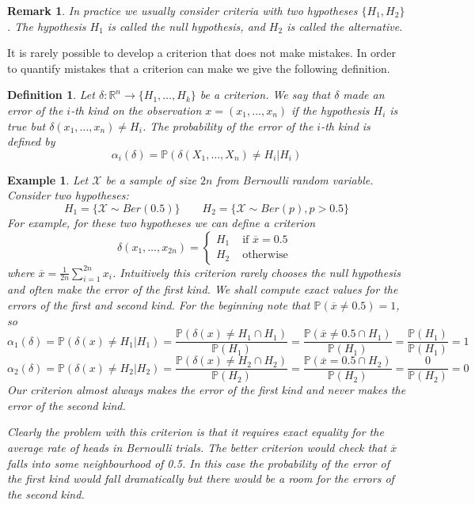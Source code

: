 \documentclass[12pt]{article}
\newtheorem{remark}[theorem]{Remark}
\newtheorem{definition}[theorem]{Definition}
\newtheorem{example}[theorem]{Example}
\begin{document}
\begin{remark} In practice we usually consider criteria with two hypotheses
    $\{H_1, H_2\}$. The hypothesis $H_1$ is called the null hypothesis, and
    $H_2$ is called the alternative.
\end{remark}

It is rarely possible to develop a criterion that does not make mistakes. In
order to quantify mistakes that a criterion can make we give the following
definition.

\begin{definition} Let $\delta:\mathbb{R}^n\to \{H_1,\ldots,H_k\}$ be a
    criterion. We say that $\delta$ made an error of the $i$-th kind on the
    observation $x=(x_1,\ldots,x_n)$ if the hypothesis $H_i$ is true but
    $\delta(x_1,\ldots,x_n)\neq H_i$. The probability of the error of the $i$-th
    kind is defined by
    $$
        \alpha_i(\delta)=\mathbb{P}(\delta(X_1,\ldots,X_n)\neq H_i | H_i)
    $$
\end{definition}

\begin{example} Let $\mathscr{X}$ be a sample of size $2n$ from Bernoulli random
    variable. Consider two hypotheses:
    $$
        H_1=\{\mathscr{X}\sim Ber(0.5)\}
        \quad\quad
        H_2=\{\mathscr{X}\sim Ber(p), p>0.5\}
    $$
    For example, for these two hypotheses we can define a criterion
    $$
        \delta(x_1,\ldots,x_{2n})
        =\begin{cases}
            H_1 & \mbox{ if } \overline{x}=0.5 \\
            H_2 & \mbox{ otherwise }
        \end{cases}
    $$
    where $\overline{x}=\frac{1}{2n}\sum_{i=1}^{2n} x_i$. Intuitively this
    criterion rarely chooses the null hypothesis and often make the error of
    the first kind. We shall compute exact values for the errors of the first
    and second kind. For the beginning note that $\mathbb{P}(\overline{x}\neq
        0.5)=1$, so
    $$
        \alpha_1(\delta)
        =\mathbb{P}(\delta(x)\neq H_1|H_1)
        =\frac{\mathbb{P}(\delta(x)\neq H_1 \cap H_1)}{\mathbb{P}(H_1)}
        =\frac{\mathbb{P}(\overline{x}\neq 0.5 \cap H_1)}{\mathbb{P}(H_1)}
        =\frac{\mathbb{P}(H_1)}{\mathbb{P}(H_1)}
        =1
    $$
    $$
        \alpha_2(\delta)
        =\mathbb{P}(\delta(x)\neq H_2|H_2)
        =\frac{\mathbb{P}(\delta(x)\neq H_2 \cap H_2)}{\mathbb{P}(H_2)}
        =\frac{\mathbb{P}(\overline{x}= 0.5 \cap H_2)}{\mathbb{P}(H_2)}
        =\frac{0}{\mathbb{P}(H_2)}
        =0
    $$
    Our criterion almost always makes the error of the first kind and never
    makes the error of the second kind.

    Clearly the problem with this criterion is that it requires exact equality
    for the average rate of heads in Bernoulli trials. The better criterion
    would check that $\overline{x}$ falls into some neighbourhood of 0.5. In
    this case the probability of the error of the first kind would fall
    dramatically but there would be a room for the errors of the second kind.
\end{example}
\end{document}
